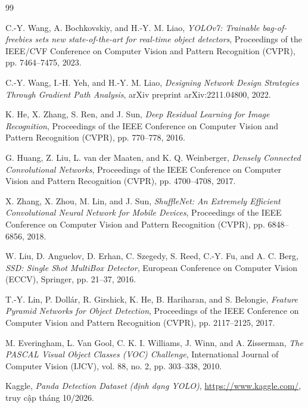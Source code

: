 \documentclass[fontsize=13pt,a4paper,oneside,DIV=calc,chapterprefix=true]{scrbook}
\begin{document}
\begin{thebibliography}{99}

C.-Y. Wang, A. Bochkovskiy, and H.-Y. M. Liao, 
\emph{YOLOv7: Trainable bag-of-freebies sets new state-of-the-art for real-time object detectors}, 
Proceedings of the IEEE/CVF Conference on Computer Vision and Pattern Recognition (CVPR), pp. 7464--7475, 2023.

C.-Y. Wang, I.-H. Yeh, and H.-Y. M. Liao, 
\emph{Designing Network Design Strategies Through Gradient Path Analysis}, 
arXiv preprint arXiv:2211.04800, 2022.

K. He, X. Zhang, S. Ren, and J. Sun, 
\emph{Deep Residual Learning for Image Recognition}, 
Proceedings of the IEEE Conference on Computer Vision and Pattern Recognition (CVPR), pp. 770--778, 2016.

G. Huang, Z. Liu, L. van der Maaten, and K. Q. Weinberger, 
\emph{Densely Connected Convolutional Networks}, 
Proceedings of the IEEE Conference on Computer Vision and Pattern Recognition (CVPR), pp. 4700--4708, 2017.

X. Zhang, X. Zhou, M. Lin, and J. Sun, 
\emph{ShuffleNet: An Extremely Efficient Convolutional Neural Network for Mobile Devices}, 
Proceedings of the IEEE Conference on Computer Vision and Pattern Recognition (CVPR), pp. 6848--6856, 2018.

W. Liu, D. Anguelov, D. Erhan, C. Szegedy, S. Reed, C.-Y. Fu, and A. C. Berg, 
\emph{SSD: Single Shot MultiBox Detector}, 
European Conference on Computer Vision (ECCV), Springer, pp. 21--37, 2016.

T.-Y. Lin, P. Dollár, R. Girshick, K. He, B. Hariharan, and S. Belongie, 
\emph{Feature Pyramid Networks for Object Detection}, 
Proceedings of the IEEE Conference on Computer Vision and Pattern Recognition (CVPR), pp. 2117--2125, 2017.

M. Everingham, L. Van Gool, C. K. I. Williams, J. Winn, and A. Zisserman, 
\emph{The PASCAL Visual Object Classes (VOC) Challenge}, 
International Journal of Computer Vision (IJCV), vol. 88, no. 2, pp. 303--338, 2010.

Kaggle,
\emph{Panda Detection Dataset (định dạng YOLO)},
\url{https://www.kaggle.com/}, truy cập tháng 10/2026.



\end{thebibliography}
\end{document}
